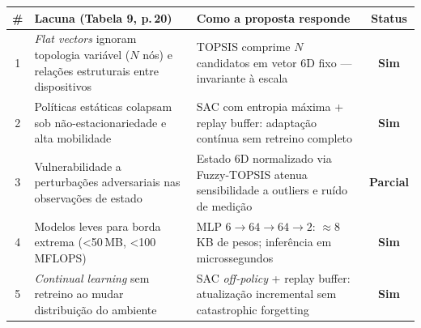 \documentclass{beamer}
\begin{document}
{
\begin{frame}[plain, t]
\color{black}
\vspace{0.15cm}
\hspace{0.3cm}{\large\bfseries\ttfamily LACUNAS ATENDIDAS PELA PROPOSTA [Miriyala \& Chirra, 2026]}
\vspace{0.12cm}

\hspace{0.3cm}\begin{minipage}{0.93\textwidth}
{\scriptsize\ttfamily

\begin{tabular}{@{}c|p{3.8cm}|p{4.8cm}|c@{}}
\textbf{\#} & \textbf{Lacuna (Tabela 9, p.\,20)} & \textbf{Como a proposta responde} & \textbf{Status} \\
\hline\noalign{\vspace{3pt}}
1 & \textit{Flat vectors} ignoram topologia variável ($N$ nós) e relações estruturais entre dispositivos &
  TOPSIS comprime $N$ candidatos em vetor 6D fixo --- invariante à escala &
  \textbf{Sim} \\[4pt]
2 & Políticas estáticas colapsam sob não-estacionariedade e alta mobilidade &
  SAC com entropia máxima + replay buffer: adaptação contínua sem retreino completo &
  \textbf{Sim} \\[4pt]
3 & Vulnerabilidade a perturbações adversariais nas observações de estado &
  Estado 6D normalizado via Fuzzy-TOPSIS atenua sensibilidade a outliers e ruído de medição &
  \textbf{Parcial} \\[4pt]
4 & Modelos leves para borda extrema (\textless50\,MB, \textless100\,MFLOPS) &
  MLP $6{\to}64{\to}64{\to}2$: $\approx$8\,KB de pesos; inferência em microssegundos &
  \textbf{Sim} \\[4pt]
5 & \textit{Continual learning} sem retreino ao mudar distribuição do ambiente &
  SAC \textit{off-policy} + replay buffer: atualização incremental sem catastrophic forgetting &
  \textbf{Sim} \\
\end{tabular}

}
\end{minipage}
\end{frame}
}
\end{document}
